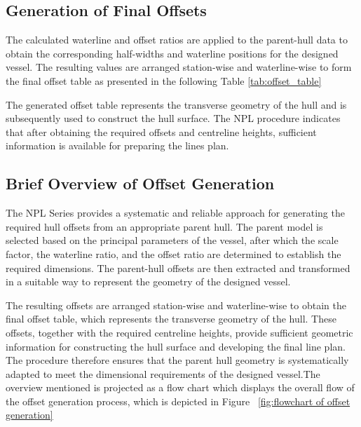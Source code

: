 \documentclass[12pt,a4paper,twoside]{report}
\begin{document}
\subsection{Generation of Final Offsets}
The calculated waterline and offset ratios are applied to the parent-hull data to obtain the corresponding half-widths and waterline positions for the designed vessel. The resulting values are arranged station-wise and waterline-wise to form the final offset table as presented in the following Table \ref{tab:offset_table}
\vspace{\baselineskip}\par\noindent The generated offset table represents the transverse geometry of the hull and is subsequently used to construct the hull surface. The NPL procedure indicates that after obtaining the required offsets and centreline heights, sufficient information is available for preparing the lines plan.
\subsection{Brief Overview of Offset Generation}
\vspace{\baselineskip}\par\noindent The NPL Series provides a systematic and reliable approach for generating the required hull offsets from an appropriate parent hull. The parent model is selected based on the principal parameters of the vessel, after which the scale factor, the waterline ratio, and the offset ratio are determined to establish the required dimensions. The parent-hull offsets are then extracted and transformed in a suitable way to represent the geometry of the designed vessel.

\vspace{\baselineskip}\par\noindent The resulting offsets are arranged station-wise and waterline-wise to obtain the final offset table, which represents the transverse geometry of the hull. These offsets, together with the required centreline heights, provide sufficient geometric information for constructing the hull surface and developing the final line plan. The procedure therefore ensures that the parent hull geometry is systematically adapted to meet the dimensional requirements of the designed vessel.The overview mentioned is projected as a flow chart which displays the overall flow of the offset generation process, which is depicted in Figure ~\ref{fig:flowchart of offset generation}
\end{document}

